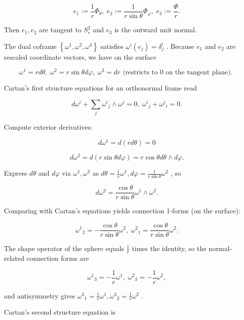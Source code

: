 \documentclass[10pt]{article}
\begin{document}
\[
{e}_{1} \mathrel{\text{ := }} \frac{1}{r}{\Phi }_{\theta },\;{e}_{2} \mathrel{\text{ := }} \frac{1}{r\sin \theta }{\Phi }_{\varphi },\;{e}_{3} \mathrel{\text{ := }} \frac{\Phi }{r}.
\]

Then \({e}_{1},{e}_{2}\) are tangent to \({S}_{r}^{2}\) and \({e}_{3}\) is the outward unit normal.

The dual coframe \(\left\{  {{\omega }^{1},{\omega }^{2},{\omega }^{3}}\right\}\) satisfies \({\omega }^{i}\left( {e}_{j}\right)  = {\delta }_{j}^{i}\) . Because \({e}_{1}\) and \({e}_{2}\) are rescaled coordinate vectors, we have on the surface

\[
{\omega }^{1} = {rd\theta },\;{\omega }^{2} = r\sin {\theta d\varphi },\;{\omega }^{3} = {dr}\text{ (restricts to 0 on the tangent plane). }
\]

Cartan's first structure equations for an orthonormal frame read

\[
d{\omega }^{i} + \mathop{\sum }\limits_{j}{\omega }^{i}{}_{j} \land  {\omega }^{j} = 0,\;{\omega }^{i}{}_{j} + {\omega }^{j}{}_{i} = 0.
\]

Compute exterior derivatives:

\[
d{\omega }^{1} = d\left( {rd\theta }\right)  = 0
\]

\[
d{\omega }^{2} = d\left( {r\sin {\theta d\varphi }}\right)  = r\cos {\theta d\theta } \land  {d\varphi }.
\]

Express \({d\theta }\) and \({d\varphi }\) via \({\omega }^{1},{\omega }^{2}\) as \({d\theta } = \frac{1}{r}{\omega }^{1},{d\varphi } = \frac{1}{r\sin \theta }{\omega }^{2}\) , so

\[
d{\omega }^{2} = \frac{\cos \theta }{r\sin \theta }{\omega }^{1} \land  {\omega }^{2}.
\]

Comparing with Cartan's equations yields connection 1-forms (on the surface):

\[
{\omega }^{1}{}_{2} =  - \frac{\cos \theta }{r\sin \theta }{\omega }^{2},\;{\omega }^{2}{}_{1} = \frac{\cos \theta }{r\sin \theta }{\omega }^{2}.
\]

The shape operator of the sphere equals \(\frac{1}{r}\) times the identity, so the normal-related connection forms are

\[
{\omega }^{1}{}_{3} =  - \frac{1}{r}{\omega }^{1},\;{\omega }^{2}{}_{3} =  - \frac{1}{r}{\omega }^{2},
\]

and antisymmetry gives \({\omega }^{3}{}_{1} = \frac{1}{r}{\omega }^{1},{\omega }^{3}{}_{2} = \frac{1}{r}{\omega }^{2}\) .

Cartan's second structure equation is
\end{document}
